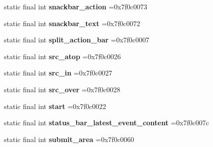 \begin{DoxyCompactItemize}
\item 
\hypertarget{classcheck_1_1test_1_1_r_1_1id_ac7ffd14f26cc22af42fa287330369e95}{}static final int {\bfseries snackbar\+\_\+action} =0x7f0c0073\label{classcheck_1_1test_1_1_r_1_1id_ac7ffd14f26cc22af42fa287330369e95}

\item 
\hypertarget{classcheck_1_1test_1_1_r_1_1id_aa93fe9cc375175eeb67a389f23942e47}{}static final int {\bfseries snackbar\+\_\+text} =0x7f0c0072\label{classcheck_1_1test_1_1_r_1_1id_aa93fe9cc375175eeb67a389f23942e47}

\item 
\hypertarget{classcheck_1_1test_1_1_r_1_1id_ab08b5a0414247affe40f9cd4cd0745fe}{}static final int {\bfseries split\+\_\+action\+\_\+bar} =0x7f0c0007\label{classcheck_1_1test_1_1_r_1_1id_ab08b5a0414247affe40f9cd4cd0745fe}

\item 
\hypertarget{classcheck_1_1test_1_1_r_1_1id_aba9850174bcec6d73373e7df7c84ebd2}{}static final int {\bfseries src\+\_\+atop} =0x7f0c0026\label{classcheck_1_1test_1_1_r_1_1id_aba9850174bcec6d73373e7df7c84ebd2}

\item 
\hypertarget{classcheck_1_1test_1_1_r_1_1id_aca22566a14f1c02d0ef5150234769eef}{}static final int {\bfseries src\+\_\+in} =0x7f0c0027\label{classcheck_1_1test_1_1_r_1_1id_aca22566a14f1c02d0ef5150234769eef}

\item 
\hypertarget{classcheck_1_1test_1_1_r_1_1id_aafecc3d70897982f7ee92a471f5b0bb9}{}static final int {\bfseries src\+\_\+over} =0x7f0c0028\label{classcheck_1_1test_1_1_r_1_1id_aafecc3d70897982f7ee92a471f5b0bb9}

\item 
\hypertarget{classcheck_1_1test_1_1_r_1_1id_a79e65c221060bc2287ca3d62b8094b99}{}static final int {\bfseries start} =0x7f0c0022\label{classcheck_1_1test_1_1_r_1_1id_a79e65c221060bc2287ca3d62b8094b99}

\item 
\hypertarget{classcheck_1_1test_1_1_r_1_1id_ae18ac3d7350855442f47a1552de0626e}{}static final int {\bfseries status\+\_\+bar\+\_\+latest\+\_\+event\+\_\+content} =0x7f0c007c\label{classcheck_1_1test_1_1_r_1_1id_ae18ac3d7350855442f47a1552de0626e}

\item 
\hypertarget{classcheck_1_1test_1_1_r_1_1id_a6fd3789ecb8fa908863403a8e282a901}{}static final int {\bfseries submit\+\_\+area} =0x7f0c0060\label{classcheck_1_1test_1_1_r_1_1id_a6fd3789ecb8fa908863403a8e282a901}


\end{DoxyCompactItemize}
